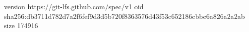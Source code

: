 version https://git-lfs.github.com/spec/v1
oid sha256:db3711d782d7a2f6fef9d3d5b720f8363576d43f53c652186cbbc6a826a2a2ab
size 174916
